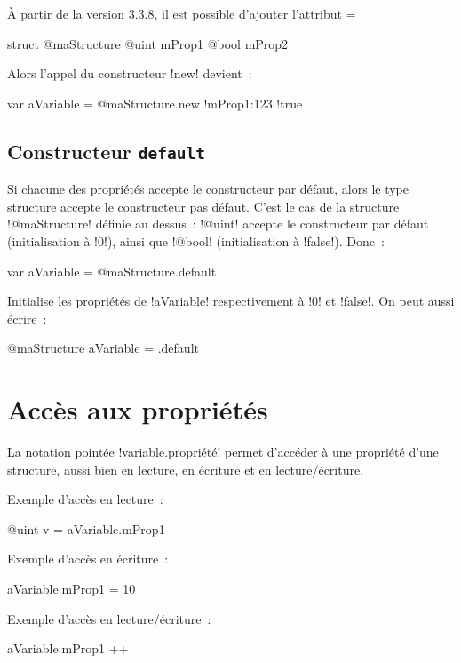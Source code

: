 À partir de la version 3.3.8, il est possible d'ajouter l'attribut \ggs=%
\begin{galgas}
struct @maStructure {
  @uint mProp1 %
  @bool mProp2
}
\end{galgas}

Alors l'appel du constructeur \ggs!new! devient~:
\begin{galgas}
var aVariable = @maStructure.new {!mProp1:123 !true}
\end{galgas}


\subsection{Constructeur \texttt{default}}

Si chacune des propriétés accepte le constructeur par défaut, alors le type structure accepte le constructeur pas défaut. C'est le cas de la structure \ggs!@maStructure! définie au dessus~: \ggs!@uint! accepte le constructeur par défaut (initialisation à \ggs!0!), ainsi que \ggs!@bool! (initialisation à \ggs!false!). Donc~:
\begin{galgas}
var aVariable = @maStructure.default
\end{galgas}
Initialise les propriétés de \ggs!aVariable! respectivement à \ggs!0! et \ggs!false!. On peut aussi écrire~:
\begin{galgas}
@maStructure aVariable = .default
\end{galgas}


\section{Accès aux propriétés}

La notation pointée \ggs!variable.propriété! permet d'accéder à une propriété d'une structure, aussi bien en lecture, en écriture et en lecture/écriture.

Exemple d'accès en lecture~:
\begin{galgas}
@uint v = aVariable.mProp1
\end{galgas}

Exemple d'accès en écriture~:
\begin{galgas}
aVariable.mProp1 = 10
\end{galgas}


Exemple d'accès en lecture/écriture~:
\begin{galgas}
aVariable.mProp1 ++
\end{galgas}





